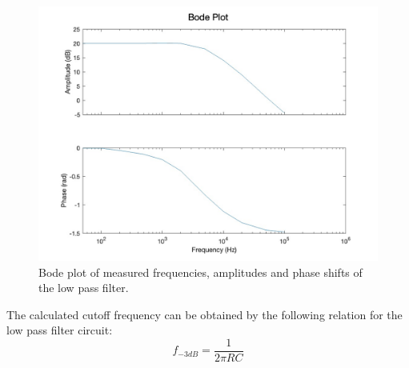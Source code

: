 \begin{figure}[H]
    \centering
    \includegraphics[scale=0.30]{images/bode_plot_low_pass_measured.jpg}
    \caption{Bode plot of measured frequencies, amplitudes and phase shifts of the low pass filter.}
\end{figure}

The calculated cutoff frequency can be obtained by the following relation for the low pass filter circuit:
\begin{equation}
    f_{-3dB} = \frac{1}{2\pi RC}
\end{equation}